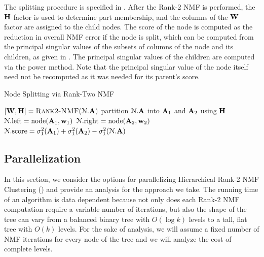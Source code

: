 \documentclass[conference,compsoc]{IEEEtran}
\begin{document}
The splitting procedure is specified in .
After the Rank-2 NMF is performed, the $\M{H}$ factor is used to determine part membership, and the columns of the $\M{W}$ factor are assigned to the child nodes.
The score of the node is computed as the reduction in overall NMF error if the node is split, which can be computed from the principal singular values of the subsets of columns of the node and its children, as given in .
The principal singular values of the children are computed via the power method.
Note that the principal singular value of the node itself need not be recomputed as it was needed for its parent's score.


\begin{algorithm}
\caption{Node Splitting via Rank-Two NMF}
\label{alg:split}
\begin{algorithmic}[1]
		\State $[\M{W},\M{H}] = \textsc{Rank2-NMF}({\cal N}.\M{A})$ \hfill {}
		\State partition ${\cal N}.\M{A}$ into $\M{A}_1$ and $\M{A}_2$ using $\M{H}$
		\State ${\cal N}.\text{left} = \text{node}(\M{A}_1,\V{W}_1)$ \hfill {}
		\State ${\cal N}.\text{right} = \text{node}(\M{A}_2,\V{W}_2)$ \hfill {}
		\State ${\cal N}.\text{score} = \sigma_1^2(\M{A}_1) + \sigma_1^2(\M{A}_2) - \sigma_1^2({\cal N}.\M{A})$ \label{line:score}
	\EndFunction
\end{algorithmic}
\end{algorithm}

\subsection{Parallelization}
\label{sec:paralgs}

In this section, we consider the options for parallelizing Hierarchical Rank-2 NMF Clustering () and provide an analysis for the approach we take.
The running time of an algorithm is data dependent because not only does each Rank-2 NMF computation require a variable number of iterations, but also the shape of the tree can vary from a balanced binary tree with $O(\log k)$ levels to a tall, flat tree with $O(k)$ levels.
For the sake of analysis, we will assume a fixed number of NMF iterations for every node of the tree and we will analyze the cost of complete levels.
\end{document}
